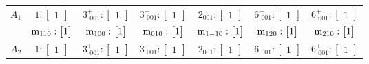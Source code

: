 \documentclass[fleqn,8pt,landscape]{jsarticle}
\begin{document}
\begin{longtable}{ccccccc}
$ A_{1} $ & $ 1:\begin{bmatrix} 1 \end{bmatrix} $ & $ 3^{+}_{\,\,001}:\begin{bmatrix} 1 \end{bmatrix} $ & $ 3^{-}_{\,\,001}:\begin{bmatrix} 1 \end{bmatrix} $ & $ 2{}_{001}:\begin{bmatrix} 1 \end{bmatrix} $ & $ 6^{-}_{\,\,001}:\begin{bmatrix} 1 \end{bmatrix} $ & $ 6^{+}_{\,\,001}:\begin{bmatrix} 1 \end{bmatrix} $ \\
& $ {\rm m}_{110}:\begin{bmatrix} 1 \end{bmatrix} $ & $ {\rm m}_{100}:\begin{bmatrix} 1 \end{bmatrix} $ & $ {\rm m}_{010}:\begin{bmatrix} 1 \end{bmatrix} $ & $ {\rm m}_{1-10}:\begin{bmatrix} 1 \end{bmatrix} $ & $ {\rm m}_{120}:\begin{bmatrix} 1 \end{bmatrix} $ & $ {\rm m}_{210}:\begin{bmatrix} 1 \end{bmatrix} $ \\ \hline
$ A_{2} $ & $ 1:\begin{bmatrix} 1 \end{bmatrix} $ & $ 3^{+}_{\,\,001}:\begin{bmatrix} 1 \end{bmatrix} $ & $ 3^{-}_{\,\,001}:\begin{bmatrix} 1 \end{bmatrix} $ & $ 2{}_{001}:\begin{bmatrix} 1 \end{bmatrix} $ & $ 6^{-}_{\,\,001}:\begin{bmatrix} 1 \end{bmatrix} $ & $ 6^{+}_{\,\,001}:\begin{bmatrix} 1 \end{bmatrix} $ \\

\end{longtable}
\end{document}
